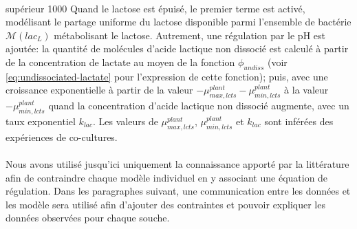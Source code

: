 \documentclass[../main.tex]{subfiles}
\begin{document}
\paragraph*{\plantarum}
\begin{itemize}
{supérieur}
{1000}{
Quand le lactose est épuisé, le premier terme est activé, modélisant le partage uniforme du lactose disponible parmi l'ensemble de bactérie $\mathcal{M}(lac_L)$ métabolisant le lactose. Autrement, une régulation par le pH est ajoutée: la quantité de molécules d'acide lactique non dissocié est calculé à partir de la concentration de lactate au moyen de la fonction $\phi_{undiss}$ (voir \eqref{eq:undissociated-lactate} pour l'expression de cette fonction); puis, avec une croissance exponentielle à partir de la valeur $-\mu^{plant}_{max,lcts}-\mu^{plant}_{min,lcts}$ à la valeur $-\mu^{plant}_{min,lcts}$ quand la concentration d'acide lactique non dissocié augmente, avec un taux exponentiel $k_{lac}$. Les valeurs de $\mu^{plant}_{max,lcts}$, $\mu^{plant}_{min,lcts}$ et $k_{lac}$ sont inférées des expériences de co-cultures.
}

\end{itemize}

\paragraph*{\freud}
\begin{itemize}
\end{itemize}


Nous avons utilisé jusqu'ici uniquement la connaissance apporté par la littérature afin de contraindre chaque modèle individuel en y associant une équation de régulation. Dans les paragraphes suivant, une communication entre les données et les modèle sera utilisé afin d'ajouter des contraintes et pouvoir expliquer les données observées pour chaque souche.\\ 
\end{document}
